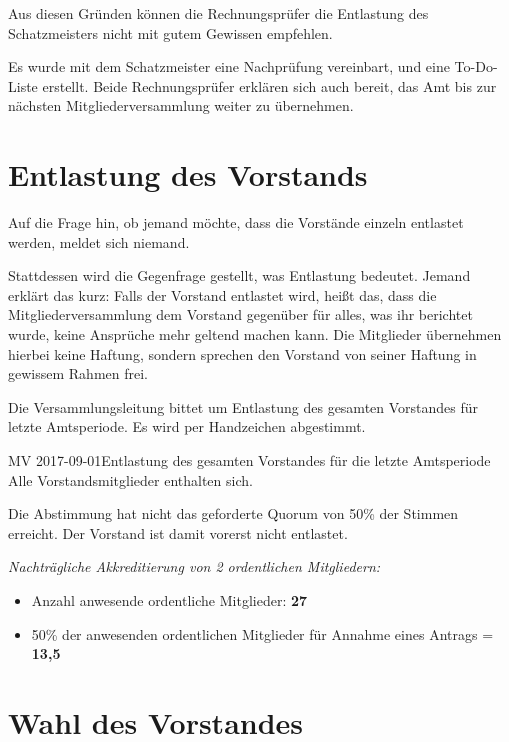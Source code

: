 \documentclass{s0minutes}
\begin{document}
Aus diesen Gründen können die Rechnungsprüfer die Entlastung des Schatzmeisters
nicht mit gutem Gewissen empfehlen.

Es wurde mit dem Schatzmeister eine Nachprüfung vereinbart, und eine To-Do-Liste
erstellt. Beide Rechnungsprüfer erklären sich auch bereit, das Amt bis zur
nächsten Mitgliederversammlung weiter zu übernehmen.

\section{Entlastung des Vorstands}

Auf die Frage hin, ob jemand möchte, dass die Vorstände einzeln entlastet
werden, meldet sich niemand.

Stattdessen wird die Gegenfrage gestellt, was Entlastung bedeutet. Jemand
erklärt das kurz: Falls der Vorstand entlastet wird, heißt das, dass die
Mitgliederversammlung dem Vorstand gegenüber für alles, was ihr berichtet
wurde, keine Ansprüche mehr geltend machen kann. Die Mitglieder übernehmen
hierbei keine Haftung, sondern sprechen den Vorstand von seiner Haftung in
gewissem Rahmen frei.

Die Versammlungsleitung bittet um Entlastung des gesamten Vorstandes für letzte
Amtsperiode. Es wird per Handzeichen abgestimmt.

\begin{resolution}{MV 2017-09-01}{}{Entlastung des
  gesamten Vorstandes für die letzte Amtsperiode\hfill}{}
  Alle Vorstandsmitglieder enthalten sich.
\end{resolution}

Die Abstimmung hat nicht das geforderte Quorum von 50\% der Stimmen erreicht.
Der Vorstand ist damit vorerst nicht entlastet.

{ \itshape
  Nachträgliche Akkreditierung von 2 ordentlichen Mitgliedern:
  \begin{itemize}[nosep]
    \item Anzahl anwesende ordentliche Mitglieder: \textbf{27}
    \item 50\% der anwesenden ordentlichen Mitglieder für Annahme eines Antrags =
      \textbf{13{,}5}
  \end{itemize}
}

\section{Wahl des Vorstandes}
\end{document}
